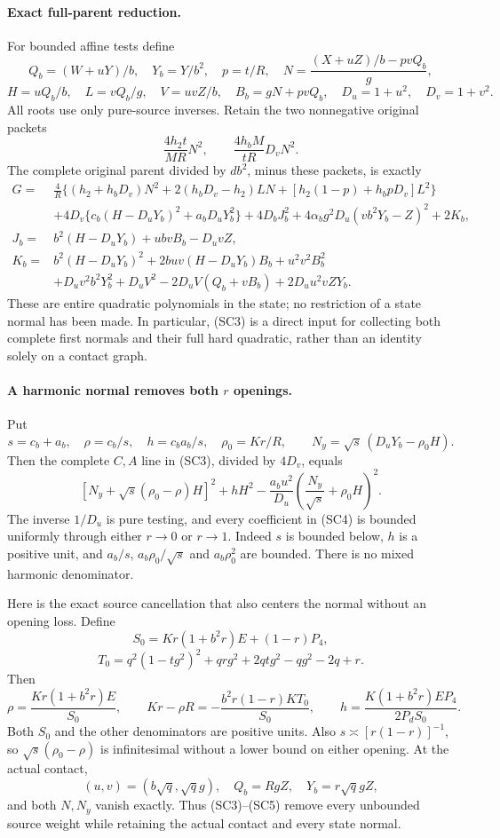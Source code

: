 \paragraph{Exact full-parent reduction.}
For bounded affine tests define
\[
 Q_b=(W+uY)/b,\quad Y_b=Y/b^2,\quad p=t/R,\quad
 N=\frac{(X+uZ)/b-pvQ_b}{g},
\]
\[
 H=uQ_b/b,\quad L=vQ_b/g,\quad V=uvZ/b,\quad
 B_b=gN+pvQ_b,\quad D_u=1+u^2,\quad D_v=1+v^2.
\]
All roots use only pure-source inverses. Retain the two nonnegative
original packets
\[
 \frac{4h_2t}{MR}N^2,
 \qquad \frac{4h_bM}{tR}D_vN^2.
\]
The complete original parent divided by $db^2$, minus these packets,
is exactly
\begin{align*}
 G={}&\frac4R\{(h_2+h_bD_v)N^2+2(h_bD_v-h_2)LN
              +[h_2(1-p)+h_bpD_v]L^2\}\\
 &+4D_v\{c_b(H-D_uY_b)^2+a_bD_uY_b^2\}
   +4D_bJ_b^2+4\alpha_b g^2D_u(vb^2Y_b-Z)^2+2K_b,
                                                        \tag{SC3}\\
 J_b={}&b^2(H-D_uY_b)+ubvB_b-D_uvZ,\\
 K_b={}&b^2(H-D_uY_b)^2+2buv(H-D_uY_b)B_b+u^2v^2B_b^2\\
 &+D_uv^2b^2Y_b^2+D_uV^2
       -2D_uV(Q_b+vB_b)+2D_uu^2vZY_b.
\end{align*}
These are entire quadratic polynomials in the state; no restriction
of a state normal has been made. In particular, (SC3) is a direct
input for collecting both complete first normals and their full hard
quadratic, rather than an identity solely on a contact graph.

\paragraph{A harmonic normal removes both $r$ openings.}
Put
\[
 s=c_b+a_b,\quad \rho=c_b/s,\quad h=c_ba_b/s,
 \quad \rho_0=Kr/R,\qquad
 N_y=\sqrt{s}\,(D_uY_b-\rho_0H).
\]
Then the complete $C,A$ line in (SC3), divided by $4D_v$, equals
\[
 \left[N_y+\sqrt{s}(\rho_0-\rho)H\right]^2+hH^2
 -\frac{a_bu^2}{D_u}
           \left(\frac{N_y}{\sqrt{s}}+\rho_0H\right)^2.
 \tag{SC4}
\]
The inverse $1/D_u$ is pure testing, and every coefficient in (SC4)
is bounded uniformly through either $r\to0$ or $r\to1$.
Indeed $s$ is bounded below, $h$ is a positive unit, and
$a_b/s$, $a_b\rho_0/\sqrt{s}$ and $a_b\rho_0^2$ are bounded.
There is no mixed harmonic denominator.

Here is the exact source cancellation that also centers the normal
without an opening loss. Define
\[
 S_0=Kr(1+b^2r)E+(1-r)P_4,
\]
\[
 T_0=q^2(1-tg^2)^2+qrg^2+2qtg^2-qg^2-2q+r.
\]
Then
\[
 \rho=\frac{Kr(1+b^2r)E}{S_0},\qquad
 Kr-\rho R=-\frac{b^2r(1-r)K T_0}{S_0},\qquad
 h=\frac{K(1+b^2r)E P_4}{2P_dS_0}.             \tag{SC5}
\]
Both $S_0$ and the other denominators are positive units. Also
$s\asymp[r(1-r)]^{-1}$, so $\sqrt{s}(\rho_0-\rho)$ is
infinitesimal without a lower bound on either opening.
At the actual contact,
\[
 (u,v)=(b\sqrt q,\sqrt q g),\quad
 Q_b=RgZ,\quad Y_b=r\sqrt q gZ,
\]
and both $N,N_y$ vanish exactly. Thus (SC3)--(SC5) remove every
unbounded source weight while retaining the actual contact and every
state normal.


